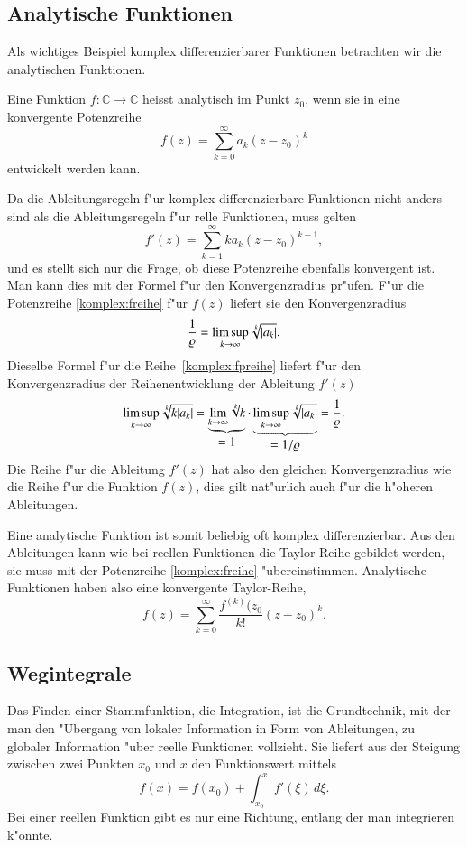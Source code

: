 %
%
\subsection{Analytische Funktionen}
Als wichtiges Beispiel komplex differenzierbarer Funktionen betrachten
wir die analytischen Funktionen.
\begin{definition}
Eine Funktion $f\colon\mathbb C\to\mathbb C$ heisst analytisch im Punkt
%
$z_0$, wenn sie in eine konvergente Potenzreihe
\begin{equation}
f(z)=\sum_{k=0}^\infty a_k(z-z_0)^k
\label{komplex:freihe}
\end{equation}
entwickelt werden kann.
\end{definition}

Da die Ableitungsregeln f"ur komplex differenzierbare Funktionen nicht
anders sind als die Ableitungsregeln f"ur relle Funktionen, muss gelten
\begin{equation}
f'(z)=\sum_{k=1}^\infty ka_k(z-z_0)^{k-1},
\label{komplex:fpreihe}
\end{equation}
und es stellt sich nur die Frage, ob diese Potenzreihe ebenfalls konvergent
ist.
Man kann dies mit der Formel f"ur den Konvergenzradius pr"ufen.
%
F"ur die Potenzreihe \eqref{komplex:freihe} f"ur $f(z)$ liefert sie den
Konvergenzradius
\[
\frac{1}{\varrho} = \limsup_{k\to\infty} \root{k}\of{|a_k|}.
\]
Dieselbe Formel f"ur die Reihe~\eqref{komplex:fpreihe} liefert
f"ur den Konvergenzradius der Reihenentwicklung der Ableitung $f'(z)$
\[
\limsup_{k\to\infty} \root{k}\of{k|a_k|}
=
\underbrace{\lim_{k\to\infty} \root{k}\of{k}}_{\displaystyle=1}
\cdot
\underbrace{ \limsup_{k\to\infty} \root{k}\of{|a_k|}}_{\displaystyle=1/\varrho}
=
\frac1{\varrho}.
\]
Die Reihe f"ur die Ableitung $f'(z)$ hat also den gleichen Konvergenzradius
wie die Reihe f"ur die Funktion $f(z)$, dies gilt nat"urlich auch f"ur
die h"oheren Ableitungen.

Eine analytische Funktion ist somit beliebig oft komplex differenzierbar.
Aus den Ableitungen kann wie bei reellen Funktionen die Taylor-Reihe
gebildet werden, sie muss mit der Potenzreihe \eqref{komplex:freihe}
"ubereinstimmen.
%
Analytische Funktionen haben also eine konvergente Taylor-Reihe,
\[
f(z) = \sum_{k=0}^\infty \frac{f^{(k)}(z_0}{k!}(z-z_0)^k.
\]

%
%
\subsection{Wegintegrale\label{subsection:wegintegrale}}
Das Finden einer Stammfunktion, die Integration, ist die Grundtechnik,
%
mit der man den "Ubergang von lokaler Information in Form von Ableitungen,
zu globaler Information "uber reelle Funktionen vollzieht.
Sie liefert aus der Steigung zwischen zwei Punkten $x_0$ und $x$ den
Funktionswert mittels
\[
f(x)=f(x_0)+\int_{x_0}^xf'(\xi)\,d\xi.
\]
Bei einer reellen Funktion gibt es nur eine Richtung, entlang der man
integrieren k"onnte.

